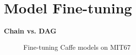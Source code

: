 \documentclass[10pt,twocolumn,letterpaper]{article}
\begin{document}
\section{Model Fine-tuning}



{\bf Chain vs. DAG}


\begin{figure}
\centering

\caption{Fine-tuning Caffe models on MIT67}
\label{fig:ft_curve}
\end{figure}
\end{document}
